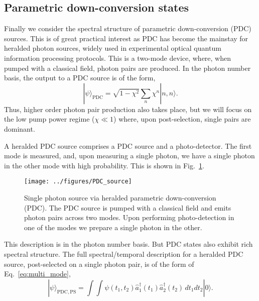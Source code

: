 \documentclass[aps,pra,twocolumn,amsmath,amssymb,color,superscriptaddress]{revtex4}
\newcommand{\ket}[1]{|#1\rangle}
\begin{document}
%
%

\subsection{Parametric down-conversion states}

Finally we consider the spectral structure of parametric down-conversion (PDC) sources. This is of great practical interest as PDC has become the mainstay for heralded photon sources, widely used in experimental optical quantum information processing protocols. This is a two-mode device, where, when pumped with a classical field, photon pairs are produced. In the photon number basis, the output to a PDC source is of the form,
\begin{equation}
\ket{\psi}_\mathrm{PDC} = \sqrt{1-\chi^2} \sum_n \chi^n \ket{n,n}.
\end{equation}
Thus, higher order photon pair production also takes place, but we will focus on the low pump power regime (\mbox{$\chi\ll 1$}) where, upon post-selection, single pairs are dominant.

A heralded PDC source comprises a PDC source and a photo-detector. The first mode is measured, and, upon measuring a single photon, we have a single photon in the other mode with high probability. This is shown in Fig.~\ref{fig:PDC_source}.
\begin{figure}[!htb]
\texttt{[image: ../figures/PDC\_source]}
\caption{Single photon source via heralded parametric down-conversion (PDC). The PDC source is pumped with a classical field and emits photon pairs across two modes. Upon performing photo-detection in one of the modes we prepare a single photon in the other.} \label{fig:PDC_source}
\end{figure}

This description is in the photon number basis. But PDC states also exhibit rich spectral structure. The full spectral/temporal description for a heralded PDC source, post-selected on a single photon pair, is of the form of Eq.~\ref{eq:multi_mode},
\begin{equation} \label{eq:PDC_spectral}
\ket{\psi}_\mathrm{PDC,PS} = \int \!\! \int \psi(t_1,t_2) \hat{a}_1^\dag(t_1) \hat{a}_2^\dag(t_2)\,dt_1 dt_2 \ket{0}.
\end{equation}
\end{document}
